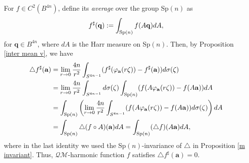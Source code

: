 \documentclass[a4paper,11pt]{amsart}
\numberwithin{equation}{section}
\begin{document}
For $f\in C^2(B^{4n})$, define its {\it average} over the group Sp$(n)$ as
\begin{equation}\begin{aligned}\label{eq sharp}
f^{\sharp}(\mathbf{q}):=\int_{{\rm Sp}(n)} f(A\mathbf{q})dA,
\end{aligned}\end{equation}
for $\mathbf{q}\in B^{4n}$, where $dA$ is the Harr measure on Sp$(n)$.
Then, by Proposition \ref{inter mean v}, we have
\begin{equation*}\begin{aligned}
\triangle f^{\sharp}(\mathbf{a})&=\lim_{r\rightarrow 0}\frac{4n}{r^2}\int_{S^{4n-1}}(f^{\sharp}(\varphi_{\mathbf{a}}(r\zeta))-f^{\sharp}(\mathbf{a}))d\sigma(\zeta)\\
&=\lim_{r\rightarrow 0}\frac{4n}{r^2}\int_{S^{4n-1}}d\sigma(\zeta)\int_{{\rm Sp}(n)}(f(A\varphi_{\mathbf{a}}(r\zeta))-f(A\mathbf{a}))dA\\
&=\int_{{\rm Sp}(n)}\left(\lim_{r\rightarrow 0}\frac{4n}{r^2}\int_{S^{4n-1}}(f(A\varphi_{\mathbf{a}}(r\zeta))-f(A\mathbf{a}))d\sigma(\zeta)\right)dA\\
&=\int_{{\rm Sp}(n)}\triangle (f\circ A)(\mathbf{a})dA=\int_{{\rm Sp}(n)}(\triangle f)(A\mathbf{a})dA,
\end{aligned}\end{equation*}
where in the last identity we used the Sp$(n)$-invariance of $\triangle$ in Proposition \ref{m invariant}.
Thus, $\mathcal{QM}$-harmonic function $f$ satisfies $\triangle f^{\sharp}(\mathbf{a})=0$.
\end{document}
